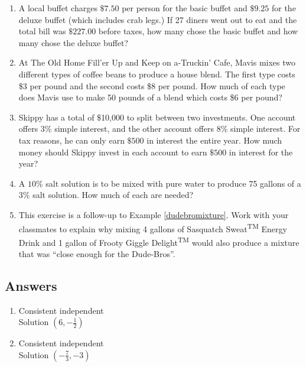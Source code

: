 \begin{enumerate}
\setcounter{enumi}{\value{HW}}

\item  A local buffet charges $\$7.50$ per person for the basic buffet and $\$9.25$ for the deluxe buffet (which includes crab legs.)  If 27 diners went out to eat and the total bill was $\$227.00$ before taxes, how many chose the basic buffet and how many chose the deluxe buffet?

\item At The Old Home Fill'er Up and Keep on a-Truckin' Cafe, Mavis mixes two different types of coffee beans to produce a house blend.   The first type costs \$3 per pound and the second costs \$8 per pound.  How much of each type does Mavis use to make 50 pounds of a blend which costs \$6 per pound?

\item  Skippy has a total of $\$$10,000 to split between two investments.  One account offers $3\%$ simple interest, and the other account offers $8\%$ simple interest.  For tax reasons, he can only earn $\$500$ in interest the entire year.  How much money should Skippy invest in each account to earn $\$500$ in interest for the year?

\item A $10 \%$ salt solution is to be mixed with pure water to produce 75 gallons of a $3\%$ salt solution.  How much of each are needed?

\item This exercise is a follow-up to Example \ref{dudebromixture}.  Work with your classmates to explain why mixing 4 gallons of Sasquatch Sweat\textsuperscript{TM} Energy Drink and 1 gallon of Frooty Giggle Delight\textsuperscript{TM} would also produce a mixture that was ``close enough for the Dude-Bros''.

\end{enumerate}

\newpage

\subsection{Answers}

\begin{multicols}{2}
\begin{enumerate}

\item Consistent independent \\
Solution $\left(6, -\frac{1}{2}\right)$

\item Consistent independent \\
Solution $\left(-\frac{7}{3}, -3\right)$ 


\setcounter{HW}{\value{enumi}}
\end{enumerate}
\end{multicols}

